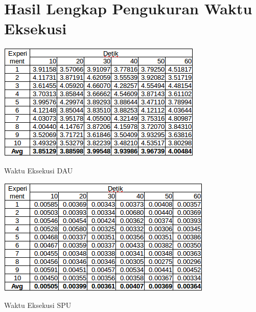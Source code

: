 \section{Hasil Lengkap Pengukuran Waktu Eksekusi}\label{lampiran:exec_time}
\begin{table}[H]
	\centering
	\includegraphics[scale=0.8]{images/exec_time_full1.png}
	\caption{Waktu Eksekusi DAU}
\end{table}
\begin{table}[H]
	\centering
	\includegraphics[scale=0.8]{images/exec_time_full2.png}
	\caption{Waktu Eksekusi SPU}
\end{table}